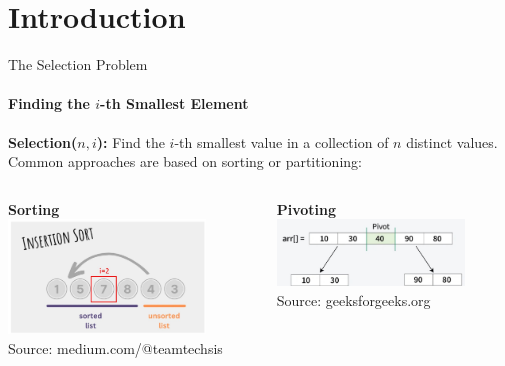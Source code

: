 \author{SEA 2025 \hspace{1cm} Johanna Hofmann}

\section{Introduction}


\begin{frame}{The Selection Problem}
  \framesubtitle{Finding the $i$-th Smallest Element}
  \textbf{Selection($n,i$):} Find the $i$-th smallest value in a collection of $n$ distinct values.
  \vfill
  \centering
  Common approaches are based on sorting or partitioning:
  \begin{columns}[T]
    \begin{column}{0.45\textwidth}
      \centering
      \textbf{Sorting}\\
      \includegraphics[width=0.8\textwidth, trim={0 0 0 3.5cm}, clip]{figures/Insertion_sort.jpg}\\
      \tiny{Source: medium.com/@teamtechsis}
    \end{column}
    \begin{column}{0.45\textwidth}
      \centering
      \textbf{Pivoting}\\
      \includegraphics[width=0.8\textwidth]{figures/Pivot.jpg}\\
      \tiny{Source: geeksforgeeks.org}
    \end{column}
  \end{columns}


\end{frame}
